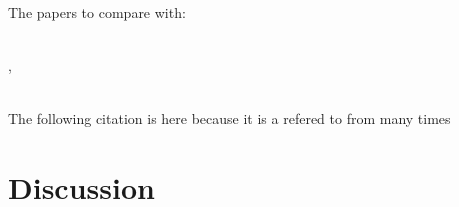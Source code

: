 The papers to compare with:\newline

\\

\cite{sabbaghnovin_model_2021}, 


\\
\cite{novin_dynamic_2018}
The following \cite{novin_dynamic_2018} citation is here because it is a refered to from \cite{sabbaghnovin_model_2021} many times




\section{Discussion}%
\label{sec:discussion}
